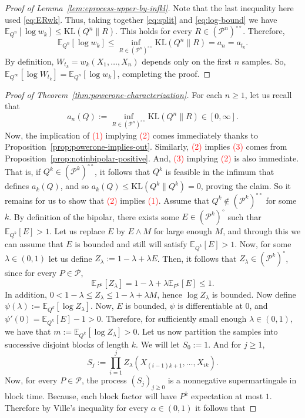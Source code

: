 \documentclass[11pt]{article}
\newcommand{\KL}{\mathrm{KL}}
\newcommand{\E}{\mathbb{E}}
\newcommand{\Pcal}{\mathcal{P}}
\theoremstyle{definition}
\theoremstyle{definition}
\begin{document}
\begin{proof}[Proof of Lemma~\ref{lem:eprocess-upper-by-infkl}]
Note that the last inequality here used \eqref{eq:ERwk}. Thus, taking together \eqref{eq:split} and \eqref{eq:log-bound} we have $\E_{Q^n}[\log w_k]\le \KL(Q^n\|R)$. This holds for every $R\in(\Pcal^n)^{\circ\circ}$. Therefore,
\[
\E_{Q^n}[\log w_k] \le \inf_{R\in(\Pcal^n)^{\circ\circ}}\KL(Q^n\|R) = a_n = a_{t_k}.
\]
By definition, $W_{t_k}=w_k(X_1,\dots,X_n)$ depends only on the first $n$ samples. So, $\E_{Q^\infty}[\log W_{t_k}]=\E_{Q^n}[\log w_k]$, completing the proof.
\end{proof}

\begin{proof}[Proof of Theorem~\ref{thm:powerone-characterization}]
For each $n\ge 1$, let us recall that
\[
a_n(Q):=\inf_{R\in(\Pcal^n)^{\circ\circ}}\KL(Q^n\|R)\in[0,\infty].
\]
Now, the implication of \textcolor{red}{(1)} implying \textcolor{red}{(2)} comes immediately thanks to Proposition~\ref{prop:powerone-implies-out}. Similarly, \textcolor{red}{(2)} implies \textcolor{red}{(3)} comes from Proposition~\ref{prop:notinbipolar-positive}. And, \textcolor{red}{(3)} implying \textcolor{red}{(2)} is also immediate. That is, if $Q^{k}\in (\Pcal^k)^{\circ\circ}$, it follows that $Q^{k}$ is feasible in the infimum that defines $a_k(Q)$, and so $a_k(Q)\le \KL(Q^k\|Q^k)=0$, proving the claim. So it remains for us to show that \textcolor{red}{(2)} implies \textcolor{red}{(1)}. Assume that $Q^k\notin (\Pcal^k)^{\circ\circ}$ for some $k$. By definition of the bipolar, there exists some $E\in(\Pcal^k)^{\circ}$ such thar $\E_{Q^k}[E]>1$. Let us replace $E$ by $E\wedge M$ for large enough $M$, and through this we can assume that $E$ is bounded and still will satisfy $\E_{Q^k}[E]>1$. Now, for some $\lambda\in(0,1)$ let us define $Z_{\lambda}:=1-\lambda+\lambda E$. Then, it follows that $Z_{\lambda}\in (\Pcal^k)^{\circ}$, since for every $P\in\Pcal$,
\[
\E_{P^k}[Z_\lambda] = 1-\lambda+\lambda\E_{P^k}[E]\le 1.
\]
In addition, $0<1-\lambda\le Z_{\lambda}\le 1-\lambda+\lambda M$, hence $\log Z_{\lambda}$ is bounded. Now define $\psi(\lambda):=\E_{Q^k}[\log Z_{\lambda}]$. Now, $E$ is bounded, $\psi$ is differentiable at $0$, and $\psi'(0)=\E_{Q^k}[E]-1>0$. Therefore, for sufficiently small enough $\lambda\in (0,1)$, we have that $m:=\E_{Q^k}[\log Z_{\lambda}]>0$. Let us now partition the samples into successive disjoint blocks of length $k$. We will let $S_0:=1$. And for $j\ge 1$,
\[
S_j:=\prod_{i=1}^jZ_\lambda(X_{(i-1)k+1},\dots,X_{ik}).
\]
Now, for every $P\in\Pcal$, the process $(S_j)_{j\ge 0}$ is a nonnegative supermartingale in block time. Because, each block factor will have $P^{k}$ expectation at most $1$. Therefore by Ville's inequality for every $\alpha\in(0,1)$ it follows that

\end{proof}
\end{document}
